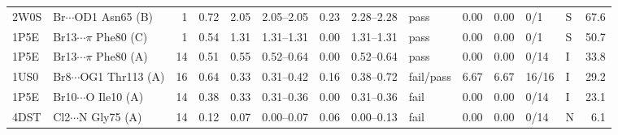 \begin{table}[!htbp]
{\begin{tabular}{llrrrlrlllrllr}
2W0S & Br$\cdots$OD1 Asn65 (B) & 1 & 0.72 & 2.05 & 2.05--2.05 & 0.23 & 2.28--2.28 & pass & 0.00 & 0.00 & 0/1 & S & 67.6\\
1P5E & Br13$\cdots$$\pi$ Phe80 (C) & 1 & 0.54 & 1.31 & 1.31--1.31 & 0.00 & 1.31--1.31 & pass & 0.00 & 0.00 & 0/1 & S & 50.7\\
1P5E & Br13$\cdots$$\pi$ Phe80 (A) & 14 & 0.51 & 0.55 & 0.52--0.64 & 0.00 & 0.52--0.64 & pass & 0.00 & 0.00 & 0/14 & I & 33.8\\
1US0 & Br8$\cdots$OG1 Thr113 (A) & 16 & 0.64 & 0.33 & 0.31--0.42 & 0.16 & 0.38--0.72 & fail/pass & 6.67 & 6.67 & 16/16 & I & 29.2\\
1P5E & Br10$\cdots$O Ile10 (A) & 14 & 0.38 & 0.33 & 0.31--0.36 & 0.00 & 0.31--0.36 & fail & 0.00 & 0.00 & 0/14 & I & 23.1\\
4DST & Cl2$\cdots$N Gly75 (A) & 14 & 0.12 & 0.07 & 0.00--0.07 & 0.06 & 0.00--0.13 & fail & 0.00 & 0.00 & 0/14 & N & 6.1\\
\bottomrule\end{tabular}}\end{table}
